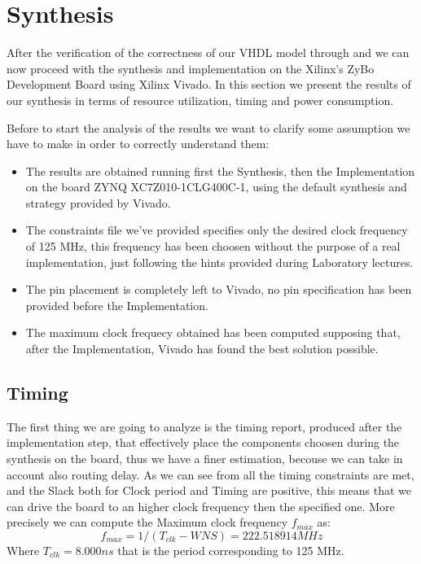 \chapter{Synthesis}\label{ch:synthesis}
After the verification of the correctness of our VHDL model through \matlab{} 
and \modelsim{} we can now proceed with the synthesis and implementation on the
Xilinx's ZyBo Development Board using Xilinx Vivado.
In this section we present the results of our synthesis in terms of resource
utilization, timing and power consumption.

Before to start the analysis of the results we want to clarify some assumption
we have to make in order to correctly understand them:
\begin{itemize}

	\item The results are obtained running first the Synthesis, then the
		Implementation on the board ZYNQ XC7Z010-1CLG400C-1, using the
		default synthesis and strategy provided by Vivado.

	\item The constraints file we've provided specifies only the desired
		clock frequency of 125 MHz, this frequency has been choosen
		without the purpose of a real implementation, just following the
		hints provided during Laboratory lectures.

	\item The pin placement is completely left to Vivado, no pin
		specification has been provided before the Implementation.

	\item The maximum clock frequecy obtained has been computed supposing
		that, after the Implementation, Vivado has found the best
		solution possible.
\end{itemize}	
\section{Timing}
The first thing we are going to analyze is the timing report, produced after the
implementation step, that effectively place the components choosen during the 
synthesis on the board, thus we have a finer estimation, becouse we can take in
account also routing delay.
As we can see from  all the timing constraints are met, and
the Slack both for Clock period and Timing are positive, this means that we can
drive the board to an higher clock frequency then the specified one. More
precisely we can compute the Maximum clock frequency \(f_{max}\) as:
		\[f_{max}= 1/(T_{clk} - WNS) = 222.518914 MHz \]
Where \(T_{clk} = 8.000ns\) that is the period corresponding to 125 MHz.

